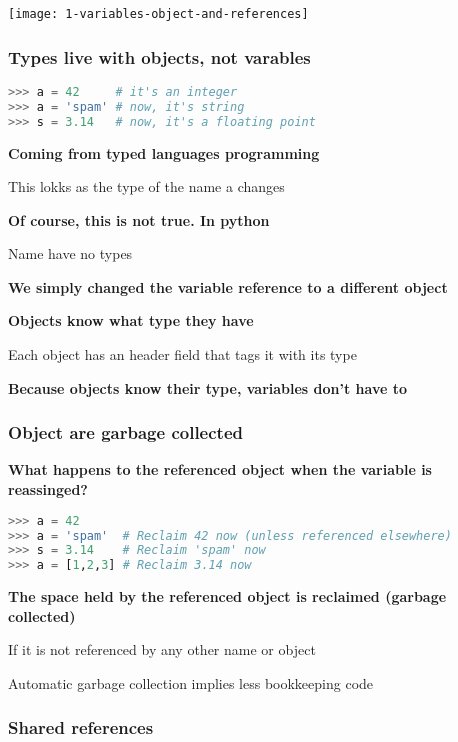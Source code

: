 \begin{center}
\texttt{[image: 1-variables-object-and-references]}
\end{center}

\subsubsection{Types live with objects, not varables}

\begin{lstlisting}[language=Python]
>>> a = 42     # it's an integer
>>> a = 'spam' # now, it's string
>>> s = 3.14   # now, it's a floating point
\end{lstlisting}

\textbf{Coming from typed languages programming}

This lokks as the type of the name a changes

\textbf{Of course, this is not true. In python}

\begin{center}
Name have no types
\end{center}

\textbf{We simply changed the variable reference to a different object}

\textbf{Objects know what type they have}

Each object has an header field that tags it with its type

\textbf{Because objects know their type, variables don't have to}


\subsubsection{Object are garbage collected}

\textbf{What happens to the referenced object when the variable is reassinged?}

\begin{lstlisting}[language=Python]
>>> a = 42     
>>> a = 'spam'  # Reclaim 42 now (unless referenced elsewhere)
>>> s = 3.14    # Reclaim 'spam' now
>>> a = [1,2,3] # Reclaim 3.14 now
\end{lstlisting}

\textbf{The space held by the referenced object is reclaimed (garbage collected)}

If it is not referenced by any other name or object

Automatic garbage collection implies less bookkeeping code

\subsubsection{Shared references}

